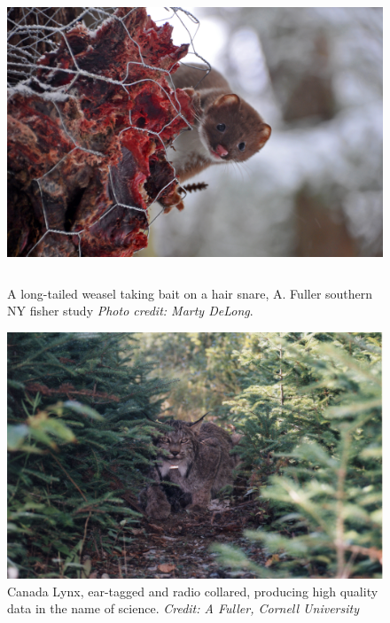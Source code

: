 \begin{figure}[h!]
\centering
\includegraphics[height=3.5in]{Ch20-Last/weasel.jpg}
\caption{
A long-tailed weasel taking bait on a hair snare, A. Fuller southern NY fisher study
{\it Photo credit: Marty DeLong}.
}
\label{last.fig.weasels}
\end{figure}



\begin{figure}[h!]
\centering
\includegraphics[width=\textwidth]{Ch20-Last/lynx.jpg}
\caption{
Canada Lynx, ear-tagged and radio collared, producing high quality
data in the name of science.
{\it Credit: A Fuller, Cornell University} }
\label{last.fig.lynx}
\end{figure}

